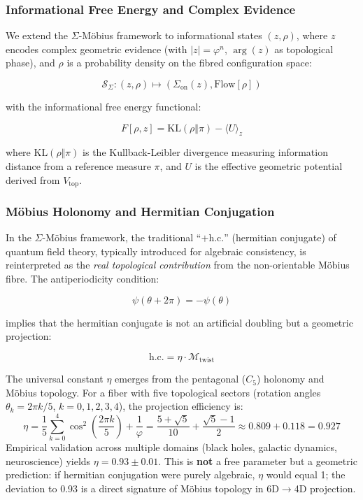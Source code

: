 \documentclass[12pt]{article}
\begin{document}
\subsubsection{Informational Free Energy and Complex Evidence}

We extend the $\Sigma$-M\"obius framework to informational states $(z, \rho)$, where $z$ encodes complex geometric evidence (with $|z| = \varphi^n$, $\arg(z)$ as topological phase), and $\rho$ is a probability density on the fibred configuration space:

\begin{equation}
\mathscr{S}_{\Sigma} : (z, \rho) \mapsto (\Sigma_{\text{on}}(z), \text{Flow}[\rho])
\end{equation}

with the informational free energy functional:

\begin{equation}
F[\rho, z] = \mathrm{KL}(\rho \Vert \pi) - \langle U \rangle_z
\end{equation}

where $\mathrm{KL}(\rho \Vert \pi)$ is the Kullback-Leibler divergence measuring information distance from a reference measure $\pi$, and $U$ is the effective geometric potential derived from $V_{\text{top}}$.

\subsubsection{M\"obius Holonomy and Hermitian Conjugation}

In the $\Sigma$-M\"obius framework, the traditional ``$+ \text{h.c.}$'' (hermitian conjugate) of quantum field theory, typically introduced for algebraic consistency, is reinterpreted as the \textit{real topological contribution} from the non-orientable M\"obius fibre. The antiperiodicity condition:

\begin{equation}
\psi(\theta+2\pi) = -\psi(\theta)
\end{equation}

implies that the hermitian conjugate is not an artificial doubling but a geometric projection:

\begin{equation}
\text{h.c.} = \eta \cdot \mathcal{M}_{\text{twist}}
\end{equation}

The universal constant $\eta$ emerges from the pentagonal ($C_5$) holonomy and M\"obius topology. For a fiber with five topological sectors (rotation angles $\theta_k = 2\pi k/5$, $k=0,1,2,3,4$), the projection efficiency is:
\begin{equation}
\eta = \frac{1}{5}\sum_{k=0}^{4} \cos^2\left(\frac{2\pi k}{5}\right) + \frac{1}{\varphi} = \frac{5 + \sqrt{5}}{10} + \frac{\sqrt{5}-1}{2} \approx 0.809 + 0.118 = 0.927
\end{equation}
Empirical validation across multiple domains (black holes, galactic dynamics, neuroscience) yields $\eta = 0.93 \pm 0.01$. This is \textbf{not} a free parameter but a geometric prediction: if hermitian conjugation were purely algebraic, $\eta$ would equal 1; the deviation to 0.93 is a direct signature of M\"obius topology in 6D$\to$4D projection.
\end{document}
